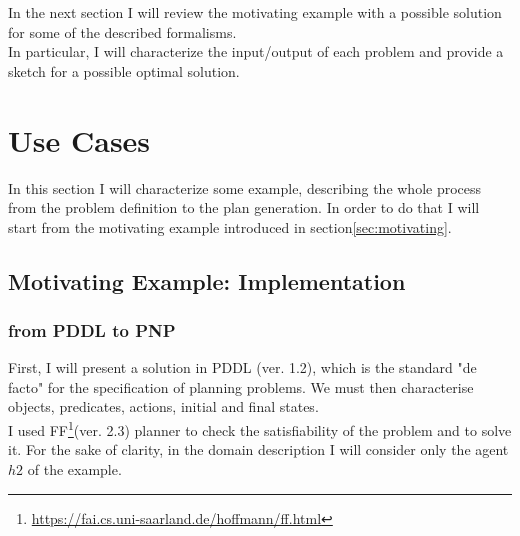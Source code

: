 \documentclass[pdftex,12pt,a4paper]{report}
\begin{document}
\noindent In the next section I will review the motivating example with a possible solution for some of the described formalisms. \\
In particular, I will characterize the input/output of each problem and provide a sketch for a possible optimal solution.

\chapter{Use Cases}\label{sec:use_cases}
In this section I will characterize some example, describing the whole process from the problem definition to the plan generation. In order to do that I will start from the motivating example introduced in section\ref{sec:motivating}.

\section{Motivating Example: Implementation}
\subsection{from PDDL to PNP}
First, I will present a solution in PDDL (ver. 1.2), which is the standard "de facto" for the specification of planning problems. We must then characterise objects, predicates, actions, initial and final states.\\
I used FF\cite{hoffmann:nebel:jair-01}\footnote{\url{https://fai.cs.uni-saarland.de/hoffmann/ff.html}}(ver. 2.3)  planner to check the satisfiability of the problem and to solve it.
For the sake of clarity, in the domain description I will consider only the agent $h2$ of the example. \\
\end{document}
